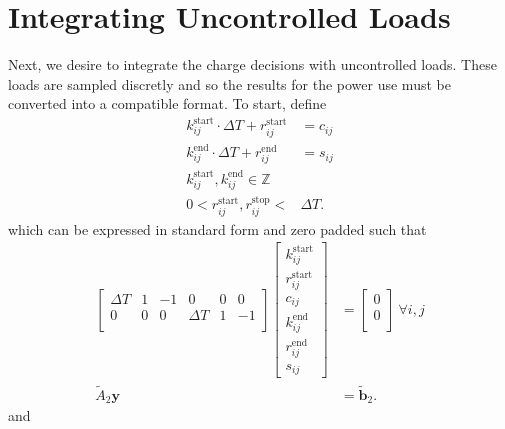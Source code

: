 \section{Integrating Uncontrolled Loads\label{sec:uncontrolled}}
Next, we desire to integrate the charge decisions with uncontrolled loads.  These loads are sampled discretly and so the results for the power use must be converted into a compatible format.  To start, define
\begin{equation} \begin{aligned}
		k^{\text{start}}_{ij}\cdot\Delta T + r^{\text{start}}_{ij}&= c_{ij} \\
		k^{\text{end}}_{ij}\cdot\Delta T + r^{\text{end}}_{ij}&= s_{ij} \\
	k^{\text{start}}_{ij}, k^{\text{end}}_{ij} \in \mathbb{Z} \\
	0 < r^{\text{start}}_{ij}, r^{\text{stop}}_{ij} < &\Delta T.
\end{aligned} \end{equation} 
which can be expressed in standard form and zero padded such that
\begin{equation} \begin{aligned}
	\begin{bmatrix}\Delta T &  1 & -1 & 0        & 0 &  0\\ 
		       0        &  0 & 0  & \Delta T & 1 & -1\\
	\end{bmatrix} 
	\begin{bmatrix} k_{ij}^{\text{start}} \\
		        r_{ij}^{\text{start}} \\
			c_{ij}                \\
			k_{ij}^{\text{end}}   \\
			r_{ij}^{\text{end}}   \\
			s_{ij}
	\end{bmatrix} &= 
	\begin{bmatrix} 0 \\
	                0 \\
	\end{bmatrix} \ \forall i,j \\ 
	\tilde{A}_2\mathbf{y} &= \tilde{\mathbf{b}}_2.
\end{aligned} \end{equation}
and 
